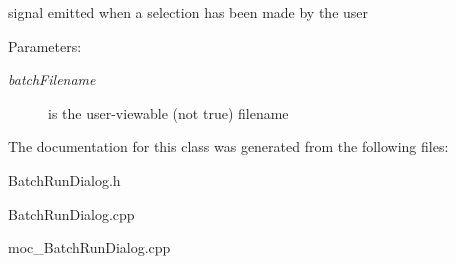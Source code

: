 signal emitted when a selection has been made by the user \begin{Desc}
\item[Parameters:]
\begin{description}
\item[{\em batchFilename}]is the user-viewable (not true) filename \end{description}
\end{Desc}


The documentation for this class was generated from the following files:\begin{CompactItemize}
\item 
BatchRunDialog.h\item 
BatchRunDialog.cpp\item 
moc\_\-BatchRunDialog.cpp\end{CompactItemize}
